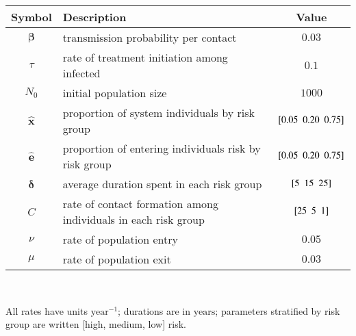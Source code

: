 \begin{tabular}{clc}
	\toprule
	    Symbol     & Description                                                     &            Value             \\
	\midrule
	 $\bm{\beta}$  & transmission probability per contact                            &            $0.03$            \\
	    $\tau$     & rate of treatment initiation among infected                     &            $0.1$             \\
	    $N_0$      & initial population size                                         &            $1000$            \\
	\midrule
	$\bm{\hat{x}}$ & proportion of system individuals by risk group                  & $[ 0.05 \enspace 0.20 \enspace 0.75 ]$ \\
	$\bm{\hat{e}}$ & proportion of entering individuals risk by risk group           & $[ 0.05 \enspace 0.20 \enspace 0.75 ]$ \\
	$\bm{\delta}$  & average duration spent in each risk group                       &    $[ 5 \enspace 15 \enspace 25 ]$     \\
	     $C$       & rate of contact formation among individuals in each risk group  &     $[ 25 \enspace 5 \enspace 1 ]$     \\
	    $\nu$      & rate of population entry                                        &            $0.05$            \\
	    $\mu$      & rate of population exit                                         &            $0.03$            \\
	\bottomrule
\end{tabular}\\[1em]
\footnotesize\raggedright
All rates have units $\mathrm{year}^{-1}$; durations are in $\mathrm{years}$;
parameters stratified by risk group are written [high, medium, low] risk.